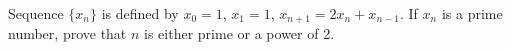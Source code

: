\problem
Sequence $\{x_n\}$ is defined by
$x_0 = 1$, $x_1 = 1$, $x_{n+1} = 2 x_{n} + x_{n-1}$.
If $x_n$ is a prime number, prove that $n$ is either prime or a power of 2.
\solution
\endproblem
